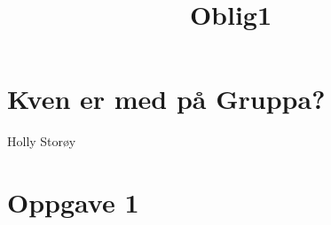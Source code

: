 \documentclass{article}
\title{Oblig1}
\begin{document}
\section*{Kven er med på Gruppa?}

Holly Storøy


\section{Oppgave 1}

%

%

%

%

%

%
%
%
\end{document}
